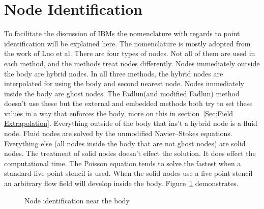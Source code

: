 \documentclass[onehalf,11pt]{beavtex}
\begin{document}
\section{Node Identification}
To facilitate the discussion of IBMs the nomenclature with regards to point identification will be explained here. 
The nomenclature is mostly adopted from the work of Luo et al.\cite{Luo:2012gx}
There are four types of nodes. 
Not all of them are used in each method, and the methods treat nodes differently. 
Nodes immediately outside the body are hybrid nodes. 
In all three methods, the hybrid nodes are interpolated for using the body and second nearest node. 
Nodes immediately inside the body are ghost nodes. 
The Fadlun(and modified Fadlun) method doesn't use these but the external and embedded methods both try to set these values in a way that enforces the body, more on this in section~\ref{Sec:Field Extrapolation}. 
Everything outside of the body that ins't a hybrid node is a fluid node. 
Fluid nodes are solved by the unmodified Navier--Stokes equations. 
Everything else (all nodes inside the body that are not ghost nodes) are solid nodes. 
The treatment of solid nodes doesn't effect the solution. 
It does effect the computational time. 
The Poisson equation tends to solve the fastest when a standard five point stencil is used. 
When the solid nodes use a five point stencil an arbitrary flow field will develop inside the body. 
Figure~\ref{fig:node id} demonstrates. 

\begin{figure}[!htb]
	\centering
	
	\caption{Node identification near the body}
	\label{fig:node id}
\end{figure}
\end{document}
